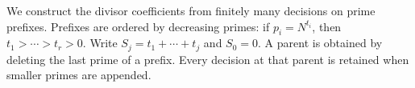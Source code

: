 We construct the divisor coefficients from finitely many decisions
on prime prefixes. Prefixes are ordered by decreasing primes:
if $p_i=N^{t_i}$, then $t_1>\cdots>t_r>0$.
Write $S_j=t_1+\cdots+t_j$ and $S_0=0$.
A parent is obtained by deleting the last prime of a prefix.
Every decision at that parent is retained when smaller primes
are appended.

